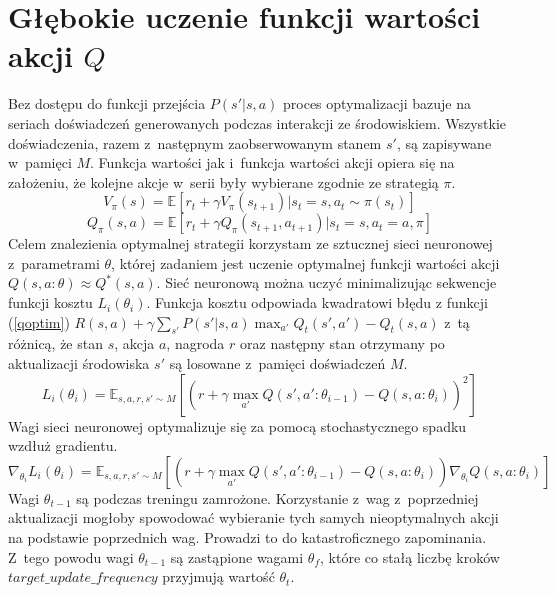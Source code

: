 \documentclass[12pt, oneside]{article}
\begin{document}
\section{Głębokie uczenie funkcji wartości akcji $Q$}
Bez dostępu do funkcji przejścia $P(s'|s,a)$ proces optymalizacji bazuje na seriach doświadczeń generowanych podczas interakcji ze środowiskiem. Wszystkie doświadczenia, razem z~następnym zaobserwowanym stanem $s'$, są zapisywane w~pamięci $M$. Funkcja wartości jak i~funkcja wartości akcji opiera się na założeniu, że kolejne akcje w~serii były wybierane zgodnie ze strategią $\pi$. 
\begin{equation}
V_\pi(s)= \mathbb{E}[r_t+ \gamma V_\pi(s_{t+1})|s_t=s, a_t \sim \pi(s_t)]
\end{equation}
\begin{equation}
Q_\pi(s,a) = \mathbb{E}[r_t + \gamma Q_\pi(s_{t+1},a_{t+1})|s_t=s,a_t=a, \pi]
\end{equation}
Celem znalezienia optymalnej strategii korzystam ze sztucznej sieci neuronowej z~parametrami $\theta$, której zadaniem jest uczenie optymalnej funkcji wartości akcji $Q(s,a: \theta ) \approx Q^*(s,a)$. Sieć neuronową można uczyć minimalizując sekwencje funkcji kosztu $L_i(\theta_i)$. Funkcja kosztu odpowiada kwadratowi błędu z funkcji (\ref{qoptim}) $R(s,a)+\gamma \sum_{s'}P(s'|s,a) \max_{a'} Q_t(s',a') - Q_t(s,a)$ z~tą różnicą, że stan $s$, akcja $a$, nagroda $r$ oraz następny stan otrzymany po aktualizacji środowiska $s'$ są losowane z~pamięci doświadczeń $M$.
\begin{equation}
L_i(\theta_i) = \mathbb{E}_{s,a,r,s' \sim M}[(r+\gamma \max_{a'} Q(s',a':\theta_{i-1}) - Q(s,a:\theta_i))^2]
\end{equation}
Wagi sieci neuronowej optymalizuje się za pomocą stochastycznego spadku wzdłuż gradientu.
\begin{equation}
\nabla_{\theta_i}L_i(\theta_i)= \mathbb{E}_{s,a,r,s' \sim M}[(r+\gamma \max_{a'} Q(s',a':\theta_{i-1}) - Q(s,a:\theta_i))\nabla_{\theta_i}Q(s,a:\theta_i)]
\end{equation}
Wagi $\theta_{t-1}$ są podczas treningu zamrożone. Korzystanie z~wag z~poprzedniej aktualizacji mogłoby spowodować wybieranie tych samych nieoptymalnych akcji na podstawie poprzednich wag. Prowadzi to do katastroficznego zapominania. Z~tego powodu wagi $\theta_{t-1}$ są zastąpione wagami $\theta_f$, które co stałą liczbę kroków $target\_update\_frequency$ przyjmują wartość $\theta_t$.
\end{document}
